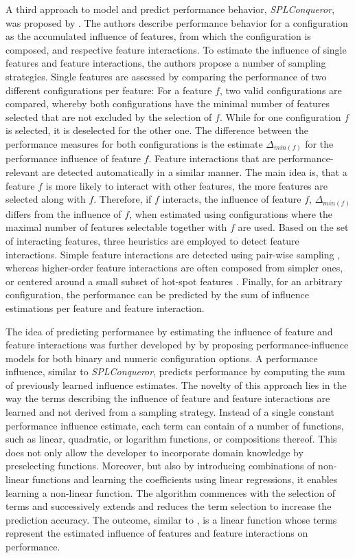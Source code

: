 A third approach to model and predict performance behavior,
\emph{SPLConqueror}, was proposed by \cite{siegmund_predicting_2012}. The
authors describe performance behavior  for a configuration as the accumulated influence of
features, from which the configuration is composed, and respective feature
interactions. To estimate the influence of single features and feature
interactions, the authors propose a number of sampling strategies. Single
features are assessed by comparing the performance of two different
configurations per feature: For a feature $f$, two valid configurations are
compared, whereby both configurations have the minimal number of features
selected that are not excluded by the selection of $f$. While for one
configuration $f$ is selected, it is deselected for the other one. The
difference between the performance measures for both configurations is the estimate
$\Delta_{min(f)}$ for the performance influence of feature $f$. Feature
interactions that are performance-relevant are detected automatically in a similar manner. The
main idea is, that a feature $f$ is more likely to interact with other features,
the more features are selected along with $f$. Therefore, if $f$ interacts, the
influence of feature $f$,  $\Delta_{min(f)}$ differs from the influence of $f$,
when estimated using configurations where the maximal number of features selectable
together with $f$ are used. Based on the set of interacting features, three
heuristics are employed to detect feature interactions. Simple feature
interactions are detected using pair-wise sampling
\citep{siegmund_predicting_2012,apel_feature-oriented_2013}, whereas
higher-order feature interactions are often composed from simpler ones, or centered
around a small subset of hot-spot features \citep{siegmund_predicting_2012}.
Finally, for an arbitrary configuration, the performance can be predicted by the
sum of influence estimations per feature and feature interaction.

The idea of predicting performance by estimating the influence of feature
and feature interactions was further developed by \cite{siegmund_performance-influence_2015} by
proposing performance-influence models for both binary and numeric
configuration options. A performance influence, similar to \emph{SPLConqueror},
predicts performance by computing the sum of previously learned influence
estimates. The novelty of this approach lies in the way the terms describing
the influence of feature and feature interactions are learned and not
derived from a sampling strategy.
Instead of a single constant performance influence estimate, each term can contain of a
number of functions, such as linear, quadratic, or logarithm functions, or
compositions thereof. This does not only allow the developer to incorporate
domain knowledge by preselecting functions. Moreover, but also by introducing
combinations of non-linear functions and learning the coefficients using linear
regressions, it enables learning a non-linear function. The algorithm commences
with the selection of terms and successively extends and reduces the term selection to increase 
the prediction accuracy. The outcome, similar to
\cite{siegmund_predicting_2012}, is a linear function whose terms represent the estimated influence of features and
feature interactions on performance.

